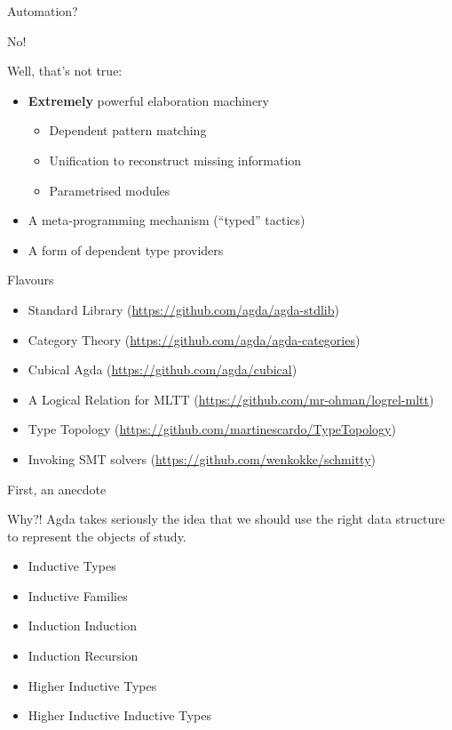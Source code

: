 \documentclass{beamer}
\begin{document}
\begin{frame}{Automation?}
  \begin{center}
    \Huge No!
  \end{center}

\vfill
Well, that's not true:
\begin{itemize}
  \item \textbf{Extremely} powerful elaboration machinery
    \begin{itemize}
      \item Dependent pattern matching
      \item Unification to reconstruct missing information
      \item Parametrised modules
    \end{itemize}
  \item A meta-programming mechanism (``typed'' tactics)
  \item A form of dependent type providers
\end{itemize}
\end{frame}

\begin{frame}{Flavours}
  \begin{itemize}
    \item Standard Library (\url{https://github.com/agda/agda-stdlib})
    \item Category Theory (\url{https://github.com/agda/agda-categories})
    \item Cubical Agda (\url{https://github.com/agda/cubical})
    \item A Logical Relation for MLTT (\url{https://github.com/mr-ohman/logrel-mltt})
    \item Type Topology (\url{https://github.com/martinescardo/TypeTopology})
    \item Invoking SMT solvers (\url{https://github.com/wenkokke/schmitty})
  \end{itemize}
\end{frame}

\begin{frame}{First, an anecdote}
\end{frame}

\begin{frame}{Why?!}
  Agda takes seriously the idea that we should use the
  right data structure to represent the objects of study.

  \begin{itemize}
    \item<1-> Inductive Types
    \item<2-> Inductive Families
    \item<3-> Induction Induction
    \item<4-> Induction Recursion
    \item<5-> Higher Inductive Types
    \item<6-> Higher Inductive Inductive Types
  \end{itemize}
\end{frame}
\end{document}
